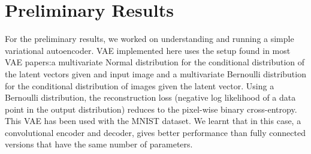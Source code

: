 \documentclass[11pt]{article}
\theoremstyle{definition}
\theoremstyle{theorem}
\begin{document}
\section{Preliminary Results} 
For the preliminary results, we worked on understanding and running a simple variational autoencoder. VAE implemented here uses the setup found in most VAE papers:a multivariate Normal distribution for the conditional distribution of the latent vectors given and input image and a multivariate Bernoulli distribution for the conditional distribution of images given the latent vector. Using a Bernoulli distribution, the reconstruction loss (negative log likelihood of a data point in the output distribution) reduces to the pixel-wise binary cross-entropy. This VAE has been used with the MNIST dataset. We learnt that in this case, a convolutional encoder and decoder,  gives better performance than fully connected versions that have the same number of parameters.
\end{document}
